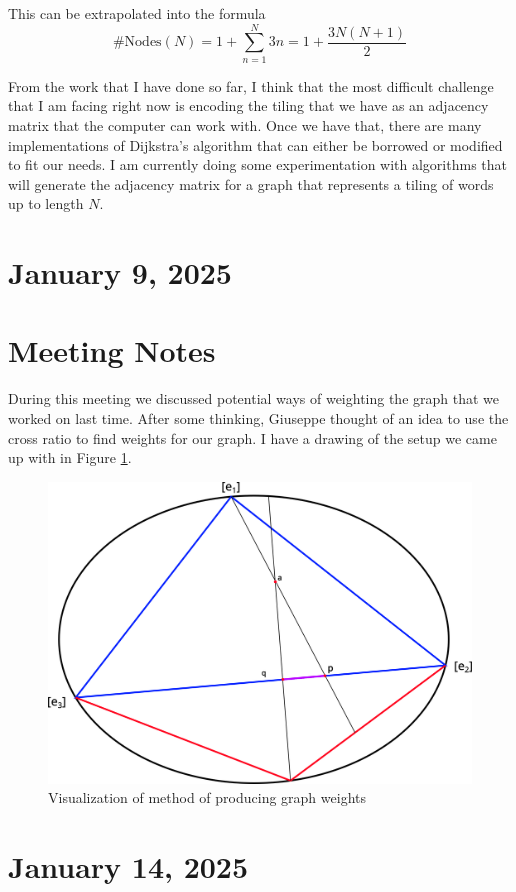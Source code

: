 \documentclass{amsart}
\begin{document}
This can be extrapolated into the formula 
\begin{equation*}
	\text{\# Nodes}(N) = 1 + \sum_{n = 1}^{N} 3n = 1 + \frac{3N (N + 1)}{2}
\end{equation*}

From the work that I have done so far, I think that the most difficult challenge that I am facing right now is encoding the tiling that we have as an adjacency matrix that the computer can work with. Once we have that, there are many implementations of Dijkstra's algorithm that can either be borrowed or modified to fit our needs. I am currently doing some experimentation with algorithms that will generate the adjacency matrix for a graph that represents a tiling of words up to length $N$. 



\section{January 9, 2025}
\section{Meeting Notes}
During this meeting we discussed potential ways of weighting the graph that we worked on last time. After some thinking, Giuseppe thought of an idea to use the cross ratio to find weights for our graph. I have a drawing of the setup we came up with in Figure \ref{fig:graph_weights}.

\begin{figure}[h]
	\includegraphics[width=0.75\linewidth]{graph_weighting_cross_ratio}
	\caption{Visualization of method of producing graph weights}
	\label{fig:graph_weights}
\end{figure}

\section{January 14, 2025}
\end{document}
